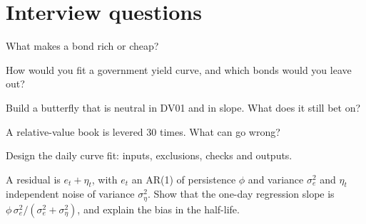 \section{Interview questions}

\begin{interviewq}\label{iq:s2:government-bond-relative-value:1}
What makes a bond rich or cheap?
\end{interviewq}

\begin{interviewq}\label{iq:s2:government-bond-relative-value:2}
How would you fit a government yield curve, and which bonds would you leave out?
\end{interviewq}

\begin{interviewq}\label{iq:s2:government-bond-relative-value:3}
Build a butterfly that is neutral in DV01 and in slope. What does it still bet on?
\end{interviewq}

\begin{interviewq}\label{iq:s2:government-bond-relative-value:4}
A relative-value book is levered 30 times. What can go wrong?
\end{interviewq}

\begin{interviewq}\label{iq:s2:government-bond-relative-value:5}
Design the daily curve fit: inputs, exclusions, checks and outputs.
\end{interviewq}

\begin{interviewq}\label{iq:s2:government-bond-relative-value:6}
A residual is $e_t + \eta_t$, with $e_t$ an AR(1) of persistence $\phi$ and variance $\sigma_e^2$ and $\eta_t$ independent noise of variance
$\sigma_\eta^2$. Show that the one-day regression slope is $\phi\,\sigma_e^2/(\sigma_e^2 + \sigma_\eta^2)$, and explain the bias in the half-life.
\end{interviewq}
